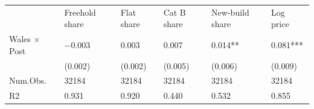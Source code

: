 \begin{tabular}{llllll}
& Freehold share & Flat share & Cat B share & New-build share & Log price \\
Wales $\times$ Post & \num{-0.003} & \num{0.003} & \num{0.007} & \num{0.014}** & \num{0.081}*** \\
& (\num{0.002}) & (\num{0.002}) & (\num{0.005}) & (\num{0.006}) & (\num{0.009}) \\
Num.Obs. & \num{32184} & \num{32184} & \num{32184} & \num{32184} & \num{32184} \\
R2 & \num{0.931} & \num{0.920} & \num{0.440} & \num{0.532} & \num{0.855} \\
\end{tabular}
